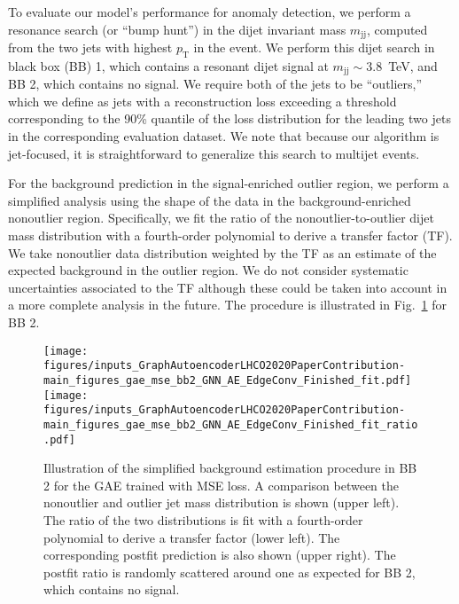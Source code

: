 \documentclass[a4paper,11pt]{article}
\newcommand{\pt}{\ensuremath{p_{\mathrm{T}}}\xspace}
\begin{document}
To evaluate our model's performance for anomaly detection, we perform a resonance search (or ``bump hunt'') in the dijet invariant mass $m_\mathrm{jj}$, computed from the two jets with highest $\pt$ in the event. 
We perform this dijet search in black box (BB) 1, which contains a resonant dijet signal at $m_\mathrm{jj}\sim 3.8$~TeV, and BB 2, which contains no signal.
We require both of the jets to be ``outliers,'' which we define as jets with a reconstruction loss exceeding a threshold corresponding to the 90\% quantile of the loss distribution for the leading two jets in the corresponding evaluation dataset.
We note that because our algorithm is jet-focused, it is straightforward to generalize this search to multijet events.


For the background prediction in the signal-enriched outlier region, we perform a simplified analysis using the shape of the data in the background-enriched nonoutlier region.
Specifically, we fit the ratio of the nonoutlier-to-outlier dijet mass distribution with a fourth-order polynomial to derive a transfer factor (TF).
We take nonoutlier data distribution weighted by the TF as an estimate of the expected background in the outlier region. 
We do not consider systematic uncertainties associated to the TF although these could be taken into account in a more complete analysis in the future.
The procedure is illustrated in Fig.~\ref{fig:fit} for BB 2.

\begin{figure}[htpb]
    \centering
    \texttt{[image: figures/inputs\_GraphAutoencoderLHCO2020PaperContribution-main\_figures\_gae\_mse\_bb2\_GNN\_AE\_EdgeConv\_Finished\_fit.pdf]}\\
    \texttt{[image: figures/inputs\_GraphAutoencoderLHCO2020PaperContribution-main\_figures\_gae\_mse\_bb2\_GNN\_AE\_EdgeConv\_Finished\_fit\_ratio.pdf]}
    \caption{Illustration of the simplified background estimation procedure in BB 2 for the GAE trained with MSE loss. 
    A comparison between the nonoutlier and outlier jet mass distribution is shown (upper left). 
    The ratio of the two distributions is fit with a fourth-order polynomial to derive a transfer factor (lower left). 
    The corresponding postfit prediction is also shown (upper right). 
    The postfit ratio is randomly scattered around one as expected for BB 2, which contains no signal.}
    \label{fig:fit}
\end{figure}
\end{document}
